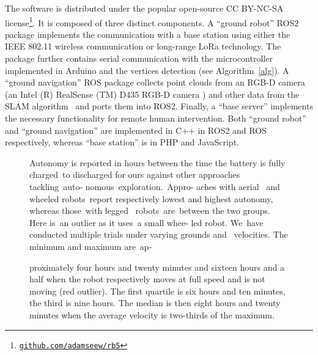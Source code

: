 \documentclass[letterpaper,10pt,conference,twoside]{IEEEtran}
\theoremstyle{definition}
\begin{document}
The %
software
is distributed under the popular open-source CC BY-NC-SA license\footnote{{\tt\footnotesize \href{https://github.com/adamseew/rb5}{github.com/adamseew/rb5}}}. It is composed of three distinct components. A ``ground robot'' ROS2 %
package implements the communication with a base station using either the IEEE 802.11 wireless communication or long-range LoRa technology. The package further %
contains serial communication with the microcontroller implemented in Arduino and the vertices detection (see Algorithm~\ref{alg}). A ``ground navigation'' ROS package collects point clouds from an RGB-D camera (an Intel (R) RealSense (TM) D435 RGB-D camera%
) and other data from the SLAM algorithm~\cite{labbe2019rtab} and ports them into ROS2. Finally, a ``base server'' implements the necessary functionality for remote human intervention.
Both ``ground robot'' and ``ground navigation'' are implemented in C++ in ROS2 and ROS respectively, whereas ``base station'' is in PHP and JavaScript.

\begin{figure}[t]
  \vspace*{-.45cm}
  \begin{minipage}[t]{0.57\columnwidth}
    \hspace*{-.5cm}
    
  \end{minipage}\hfill
  \begin{minipage}[t]{0.42\columnwidth}
    \vspace*{-5.1cm}
    \centering
    \caption{Autonomy is reported in hours between the time the battery is fully charged~to discharged for ours against other approaches tackling~auto- nomous~exploration.~Appro- aches with aerial~\cite{schmid2020efficient,kulkarni2022autonomous} and wheeled \cite{muller2021openbot,roucek2020darpa,surmann2003autonomous} robots~report respectively lowest and highest autonomy, whereas those~with legged~\cite{kulkarni2022autonomous,tranzatto2022cerberus} robots~are~between the two groups. Here  \cite{muller2021openbot} is~an outlier as it uses~a small whee- led robot. We~have conducted multiple trials under varying grounds and ~velocities. The minimum and maximum are~ap-}
    \label{fig}
  \end{minipage}
  \vspace*{-.4cm}
  \caption*{proximately four hours and twenty minutes and sixteen hours and a half when the robot respectively moves at full speed and is not moving (red outlier). The first quartile is six hours and ten minutes, the third is nine hours. The median is then eight hours and twenty minutes when the average velocity is two-thirds of the maximum.}
  \vspace*{-.3cm}
\end{figure}
\end{document}
